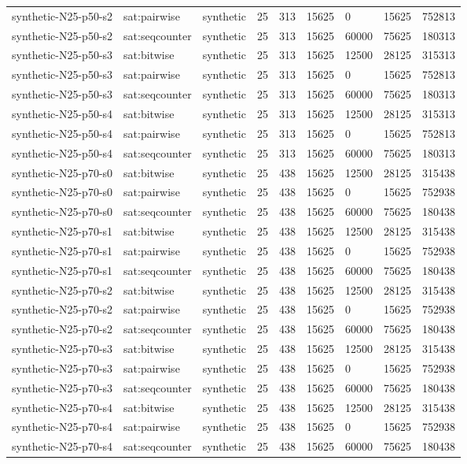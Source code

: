 \begin{tabular}{lllllllll}
synthetic-N25-p50-s2 & sat:pairwise & synthetic & 25 & 313 & 15625 & 0 & 15625 & 752813 \\
synthetic-N25-p50-s2 & sat:seqcounter & synthetic & 25 & 313 & 15625 & 60000 & 75625 & 180313 \\
synthetic-N25-p50-s3 & sat:bitwise & synthetic & 25 & 313 & 15625 & 12500 & 28125 & 315313 \\
synthetic-N25-p50-s3 & sat:pairwise & synthetic & 25 & 313 & 15625 & 0 & 15625 & 752813 \\
synthetic-N25-p50-s3 & sat:seqcounter & synthetic & 25 & 313 & 15625 & 60000 & 75625 & 180313 \\
synthetic-N25-p50-s4 & sat:bitwise & synthetic & 25 & 313 & 15625 & 12500 & 28125 & 315313 \\
synthetic-N25-p50-s4 & sat:pairwise & synthetic & 25 & 313 & 15625 & 0 & 15625 & 752813 \\
synthetic-N25-p50-s4 & sat:seqcounter & synthetic & 25 & 313 & 15625 & 60000 & 75625 & 180313 \\
synthetic-N25-p70-s0 & sat:bitwise & synthetic & 25 & 438 & 15625 & 12500 & 28125 & 315438 \\
synthetic-N25-p70-s0 & sat:pairwise & synthetic & 25 & 438 & 15625 & 0 & 15625 & 752938 \\
synthetic-N25-p70-s0 & sat:seqcounter & synthetic & 25 & 438 & 15625 & 60000 & 75625 & 180438 \\
synthetic-N25-p70-s1 & sat:bitwise & synthetic & 25 & 438 & 15625 & 12500 & 28125 & 315438 \\
synthetic-N25-p70-s1 & sat:pairwise & synthetic & 25 & 438 & 15625 & 0 & 15625 & 752938 \\
synthetic-N25-p70-s1 & sat:seqcounter & synthetic & 25 & 438 & 15625 & 60000 & 75625 & 180438 \\
synthetic-N25-p70-s2 & sat:bitwise & synthetic & 25 & 438 & 15625 & 12500 & 28125 & 315438 \\
synthetic-N25-p70-s2 & sat:pairwise & synthetic & 25 & 438 & 15625 & 0 & 15625 & 752938 \\
synthetic-N25-p70-s2 & sat:seqcounter & synthetic & 25 & 438 & 15625 & 60000 & 75625 & 180438 \\
synthetic-N25-p70-s3 & sat:bitwise & synthetic & 25 & 438 & 15625 & 12500 & 28125 & 315438 \\
synthetic-N25-p70-s3 & sat:pairwise & synthetic & 25 & 438 & 15625 & 0 & 15625 & 752938 \\
synthetic-N25-p70-s3 & sat:seqcounter & synthetic & 25 & 438 & 15625 & 60000 & 75625 & 180438 \\
synthetic-N25-p70-s4 & sat:bitwise & synthetic & 25 & 438 & 15625 & 12500 & 28125 & 315438 \\
synthetic-N25-p70-s4 & sat:pairwise & synthetic & 25 & 438 & 15625 & 0 & 15625 & 752938 \\
synthetic-N25-p70-s4 & sat:seqcounter & synthetic & 25 & 438 & 15625 & 60000 & 75625 & 180438 \\
\hline
\end{tabular}
